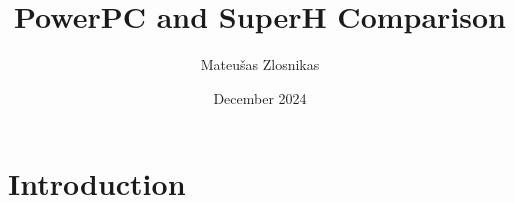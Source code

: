 \documentclass{article}
\title{PowerPC and SuperH Comparison}
\author{Mateušas Zlosnikas}
\date{December 2024}
\begin{document}
\maketitle

\section{Introduction}
\end{document}

